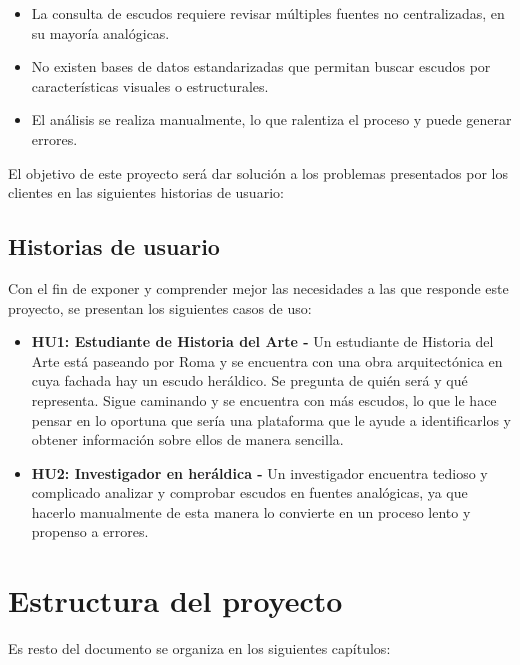 \begin{itemize}
    \item La consulta de escudos requiere revisar múltiples fuentes no centralizadas, 
    en su mayoría analógicas.
    \item No existen bases de datos estandarizadas que permitan buscar escudos por
    características visuales o estructurales.
    \item El análisis se realiza manualmente, lo que ralentiza el proceso y puede
    generar errores.
\end{itemize}

El objetivo de este proyecto será dar solución a los problemas presentados por los
clientes en las siguientes historias de usuario:

\subsection{Historias de usuario}
Con el fin de exponer y comprender mejor las necesidades a las que responde este
proyecto, se presentan los siguientes casos de uso:

\begin{itemize}
    \item \textbf{HU1: Estudiante de Historia del Arte - }Un estudiante de Historia del 
    Arte está paseando por Roma y se encuentra con una obra arquitectónica en cuya fachada
    hay un escudo heráldico. Se pregunta de quién será y qué representa. Sigue caminando 
    y se encuentra con más escudos, lo que le hace pensar en lo oportuna que sería una 
    plataforma que le ayude a identificarlos y obtener información sobre ellos de manera 
    sencilla.
    \item \textbf{HU2: Investigador en heráldica - }Un investigador encuentra tedioso y
    complicado analizar y comprobar escudos en fuentes analógicas, ya que hacerlo manualmente
    de esta manera lo convierte en un proceso lento y propenso a errores.
\end{itemize}

\section{Estructura del proyecto}
Es resto del documento se organiza en los siguientes capítulos:

